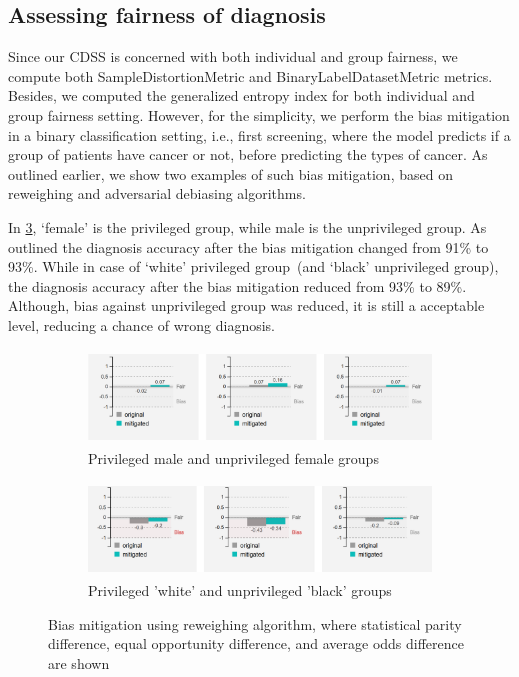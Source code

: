 \iffalse
\subsection{Assessing fairness of diagnosis}
 Since our CDSS is concerned with both individual and group fairness, we compute both SampleDistortionMetric and  BinaryLabelDatasetMetric metrics. Besides, we computed the generalized entropy index for both individual and group fairness setting. However, for the simplicity, we perform the bias mitigation in a binary classification setting, i.e., first screening, where the model predicts if a group of patients have cancer or not, before predicting the types of cancer. As outlined earlier, we show two examples of such bias mitigation, based on reweighing and adversarial debiasing algorithms. 

\hspace*{3.5mm} In \cref{fig:debiases_1}, `female' is the privileged group, while male is the unprivileged group. As outlined the diagnosis accuracy after the bias mitigation changed from 91\% to 93\%. While in case of `white' privileged group~(and `black' unprivileged group), the diagnosis accuracy after the bias mitigation reduced from 93\% to 89\%. Although, bias against unprivileged group was reduced, it is still a acceptable level, reducing a chance of wrong diagnosis.  

\begin{figure}[h]
	\centering
	\begin{subfigure}{.48\linewidth}
		\centering
		\includegraphics[width=\linewidth,height=25mm]{images/debias_1.png}
		\caption{Privileged male and unprivileged female groups}
		 \label{fig:debias_1}
	\end{subfigure}
	\begin{subfigure}{0.48\linewidth}
		\centering
		\includegraphics[width=\linewidth,height=25mm]{images/debias_2.png}
		\caption{Privileged 'white' and unprivileged 'black' groups}
        \label{fig:debias_2}
	\end{subfigure}
	\caption{Bias mitigation using reweighing algorithm, where statistical parity difference, equal opportunity difference, and average odds difference are shown}
	\label{fig:debiases_1}
	\vspace{-2mm}
\end{figure}

